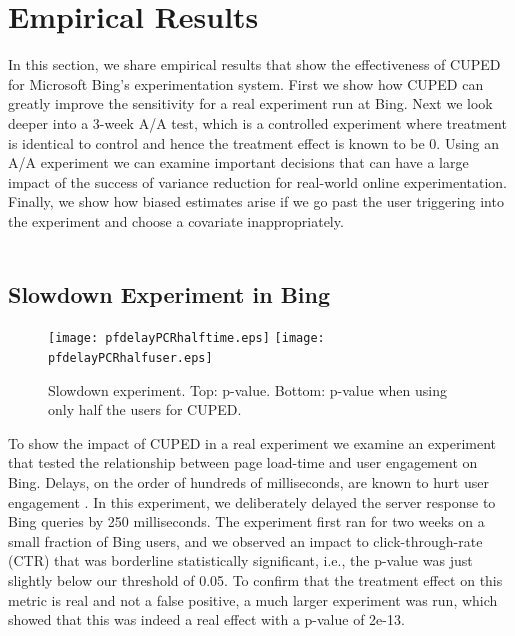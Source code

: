 \documentclass{sig-alternate}
\begin{document}
\section{Empirical Results}\label{sec:emp}
In this section, we share empirical results that show the effectiveness of CUPED for Microsoft Bing's experimentation system. 
First we show how CUPED can greatly improve the sensitivity for a real experiment run at Bing. Next we look deeper into a 3-week A/A test, which is a controlled experiment where treatment is identical to control and hence the treatment effect is known to be $0$. Using an A/A experiment we can examine important decisions that can have a large impact of the success of variance reduction for real-world online experimentation. Finally, we show how biased estimates  arise if we go past the user triggering into the experiment and choose a covariate inappropriately. 
\\
\\
\subsection{Slowdown Experiment in Bing}
\begin{figure}[!b]
  \centering
  \texttt{[image: pfdelayPCRhalftime.eps]}
  \texttt{[image: pfdelayPCRhalfuser.eps]}
  \caption{Slowdown experiment. Top: p-value. Bottom: p-value when using only half the users for CUPED.}
  \label{fig:pfdelay}
\end{figure}
To show the impact of CUPED in a real experiment we examine an experiment that tested the relationship between page load-time and user engagement on Bing. Delays, on the order of hundreds of milliseconds, are known to hurt user engagement \citep[Section 6.1.2]{expsurvey}.  In this experiment, we deliberately delayed the server response to Bing queries by 250 milliseconds. The experiment first ran for two weeks on a small fraction of Bing users, and we observed an impact to click-through-rate (CTR) that was borderline statistically significant, i.e., the p-value was just slightly below our threshold of 0.05.  To confirm that the treatment effect on this metric is real and not a false positive, a much larger experiment was run, which showed that this was indeed a real effect with a p-value of 2e-13. 
\end{document}
